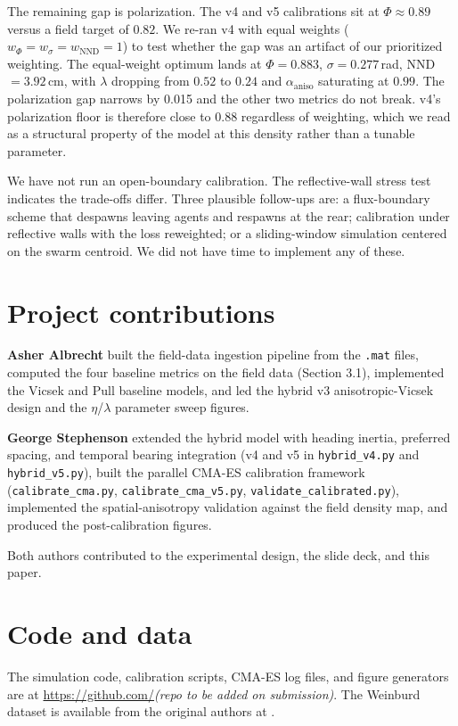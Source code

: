\documentclass[11pt]{article}
\begin{document}
The remaining gap is polarization. The v4 and v5 calibrations sit at
$\Phi \approx 0.89$ versus a field target of $0.82$. We re-ran v4 with
equal weights ($w_\Phi = w_\sigma = w_\text{NND} = 1$) to test whether
the gap was an artifact of our prioritized weighting. The equal-weight
optimum lands at $\Phi = 0.883$, $\sigma = 0.277$\,rad, NND
$= 3.92$\,cm, with $\lambda$ dropping from $0.52$ to $0.24$ and
$\alpha_\text{aniso}$ saturating at $0.99$. The polarization gap
narrows by 0.015 and the other two metrics do not break. v4's
polarization floor is therefore close to $0.88$ regardless of
weighting, which we read as a structural property of the model at
this density rather than a tunable parameter.

We have not run an open-boundary calibration. The reflective-wall
stress test indicates the trade-offs differ. Three plausible follow-ups
are: a flux-boundary scheme that despawns leaving agents and respawns
at the rear; calibration under reflective walls with the loss reweighted;
or a sliding-window simulation centered on the swarm centroid. We did
not have time to implement any of these.

\section{Project contributions}

\textbf{Asher Albrecht} built the field-data ingestion pipeline from the
\citet{weinburd2024} \texttt{.mat} files, computed the four baseline
metrics on the field data (Section 3.1), implemented the Vicsek and Pull
baseline models, and led the hybrid v3 anisotropic-Vicsek design and the
$\eta$/$\lambda$ parameter sweep figures.

\textbf{George Stephenson} extended the hybrid model with heading inertia,
preferred spacing, and temporal bearing integration (v4 and v5 in
\texttt{hybrid\_v4.py} and \texttt{hybrid\_v5.py}), built the parallel
CMA-ES calibration framework (\texttt{calibrate\_cma.py},
\texttt{calibrate\_cma\_v5.py}, \texttt{validate\_calibrated.py}),
implemented the spatial-anisotropy validation against the field density
map, and produced the post-calibration figures.

Both authors contributed to the experimental design, the slide deck,
and this paper.

\section*{Code and data}

The simulation code, calibration scripts, CMA-ES log files, and figure
generators are at \url{https://github.com/}\textit{(repo to be added on
submission)}. The Weinburd dataset is available from the original
authors at \citet{weinburd2024}.



\end{document}
